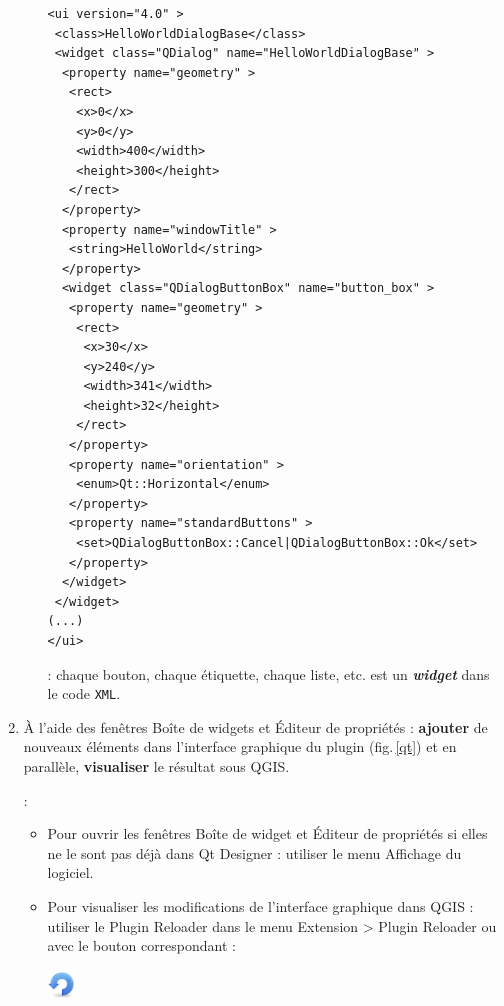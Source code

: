 \documentclass[11pt]{article}
\begin{document}
\begin{enumerate}
\begin{itemize}
\vspace*{-1.2em}
\begin{center}
\begin{minipage}[t]{0.9\textwidth}
\begin{verbatim}
<ui version="4.0" >
 <class>HelloWorldDialogBase</class>
 <widget class="QDialog" name="HelloWorldDialogBase" >
  <property name="geometry" >
   <rect>
    <x>0</x>
    <y>0</y>
    <width>400</width>
    <height>300</height>
   </rect>
  </property>
  <property name="windowTitle" >
   <string>HelloWorld</string>
  </property>
  <widget class="QDialogButtonBox" name="button_box" >
   <property name="geometry" >
    <rect>
     <x>30</x>
     <y>240</y>
     <width>341</width>
     <height>32</height>
    </rect>
   </property>
   <property name="orientation" >
    <enum>Qt::Horizontal</enum>
   </property>
   <property name="standardButtons" >
    <set>QDialogButtonBox::Cancel|QDialogButtonBox::Ok</set>
   </property>
  </widget>
 </widget>
(...)
</ui>
\end{verbatim}
\end{minipage}
\end{center}
\vspace*{1em} 

\underline{}: chaque bouton, chaque étiquette, chaque liste, etc. est un \emph{\textbf{widget}} dans le code \texttt{XML}. 
\end{itemize}



\newpage{}
\item À l'aide des fenêtres \og{}Boîte de widgets\fg{} et \og{}Éditeur de propriétés\fg{} : \textbf{ajouter} de nouveaux éléments dans l'interface graphique du plugin (fig.\,\ref{qt}) et en parallèle, \textbf{visualiser} le résultat sous QGIS. 

\underline{}: 
\begin{itemize}\itemsep0.2em
\renewcommand\labelitemi{\---}
\item Pour ouvrir les fenêtres \og{}Boîte de widget\fg{} et \og{}Éditeur de propriétés\fg{} si elles ne le sont pas déjà dans \og{}Qt Designer\fg{} : utiliser le menu \og{}Affichage\fg{} du logiciel. 
\item Pour visualiser les modifications de l'interface graphique dans QGIS : utiliser le \og{}Plugin Reloader\fg{} dans le menu \og{}Extension\fg{} > \og{}Plugin Reloader\fg{} ou avec le bouton correspondant : 
\begin{center}
\includegraphics[width=2em]{reload.png}
\end{center}


\end{itemize}
\end{enumerate}
\end{document}
